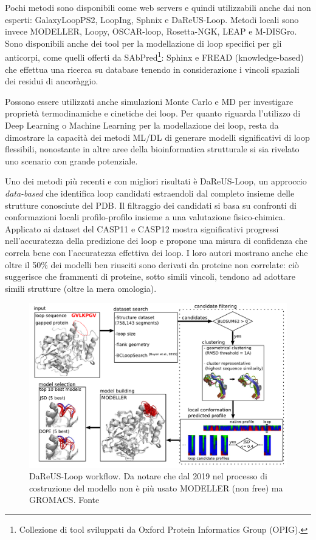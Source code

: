 {\par Pochi metodi sono disponibili come web servers e quindi utilizzabili anche dai non esperti: GalaxyLoopPS2, LoopIng, Sphnix e DaReUS-Loop. Metodi locali sono invece MODELLER, Loopy, OSCAR-loop, Rosetta-NGK, LEAP e M-DISGro. Sono disponibili anche dei tool per la modellazione di loop specifici per gli anticorpi, come quelli offerti da SAbPred\footnote{Collezione di tool sviluppati da Oxford Protein Informatics Group (OPIG).}: Sphinx e FREAD (knowledge-based) che effettua una ricerca su database tenendo in considerazione i vincoli spaziali dei residui di ancoràggio.

\par Possono essere utilizzati anche simulazioni Monte Carlo e MD per investigare proprietà termodinamiche e cinetiche dei loop. Per quanto riguarda l'utilizzo di Deep Learning o Machine Learning per la modellazione dei loop, resta da dimostrare la capacità dei metodi ML/DL di generare modelli significativi di loop flessibili, nonostante in altre aree della bioinformatica strutturale si sia rivelato uno scenario con grande potenziale\supercite{barozet2021current}.

\par Uno dei metodi più recenti e con migliori risultati è DaReUS-Loop, un approccio  \textit{data-based} che identifica loop candidati estraendoli dal completo insieme delle strutture conosciute del PDB. Il filtraggio dei candidati si basa su confronti di conformazioni locali profilo-profilo insieme a una valutazione fisico-chimica. Applicato ai dataset del CASP11 e CASP12 mostra significativi progressi nell'accuratezza della predizione dei loop e propone una misura di confidenza che correla bene con l'accuratezza effettiva dei loop. I loro autori mostrano anche che oltre il 50\% dei modelli ben riusciti sono derivati da proteine non correlate: ciò suggerisce che frammenti di proteine, sotto simili vincoli, tendono ad adottare simili strutture (oltre la mera omologia)\supercite{karami2018dareus}. 

\begin{figure}[!htb]
	\centering
	\includegraphics[scale=0.45]{images/dareus.png}
	\caption{DaReUS-Loop workflow. Da notare che dal 2019\supercite{karamiLoop} nel processo di costruzione del modello non è più usato MODELLER (non free) ma GROMACS. Fonte\cite{karami2018dareus}}
	\label{fig:dareus-workflow}
\end{figure}

}
